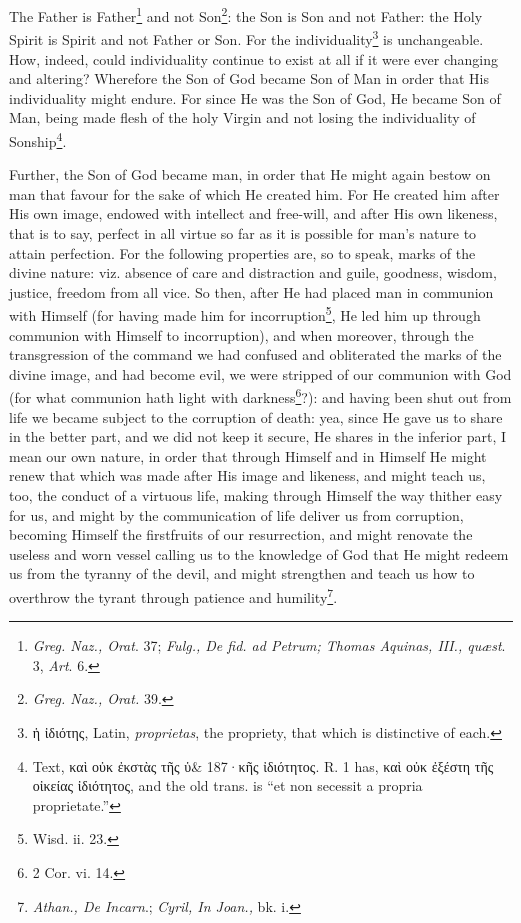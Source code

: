 The Father is Father\footnote{\emph{Greg. Naz., Orat}. 37; \emph{Fulg., De fid. ad Petrum; Thomas Aquinas, III., quæst}. 3, \emph{Art}. 6.} and not Son\footnote{\emph{Greg. Naz., Orat. }39.}: the Son is Son and not Father: the Holy Spirit is Spirit and not Father or Son. For the individuality\footnote{\textgreek{ἡ ἰδιότης}, Latin, \emph{proprietas}, the propriety, that which is distinctive of each.} is unchangeable. How, indeed, could individuality continue to exist at all if it were ever changing and altering? Wherefore the Son of God became Son of Man in order that His individuality might endure. For since He was the Son of God, He became Son of Man, being made flesh of the holy Virgin and not losing the individuality of Sonship\footnote{Text, \textgreek{καὶ οὐκ ἐκστὰς τῆς ὑ\& 187·κῆς ἰδιότητος}. R. 1 has, \textgreek{καὶ οὐκ ἐξέστη τῆς οἰκείας ἰδιότητος}, and the old trans. is “et non secessit a propria proprietate.”}.

Further, the Son of God became man, in order that He might again bestow on man that favour for the sake of which He created him. For He created him after His own image, endowed with intellect and free-will, and after His own likeness, that is to say, perfect in all virtue so far as it is possible for man’s nature to attain perfection. For the following properties are, so to speak, marks of the divine nature: viz. absence of care and distraction and guile, goodness, wisdom, justice, freedom from all vice. So then, after He had placed man in communion with Himself (for having made him for incorruption\footnote{Wisd. ii. 23.}, He led him up through communion with Himself to incorruption), and when moreover, through the transgression of the command we had confused and obliterated the marks of the divine image, and had become evil, we were stripped of our communion with God (for what communion hath light with darkness\footnote{2 Cor. vi. 14.}?): and having been shut out from life we became subject to the corruption of death: yea, since He gave us to share in the better part, and we did not keep it secure, He shares in the inferior part, I mean our own nature, in order that through Himself and in Himself He might renew that which was made after His image and likeness, and might teach us, too, the conduct of a virtuous life, making through Himself the way thither easy for us, and might by the communication of life deliver us from corruption, becoming Himself the firstfruits of our resurrection, and might renovate the useless and worn vessel calling us to the knowledge of God that He might redeem us from the tyranny of the devil, and might strengthen and teach us how to overthrow the tyrant through patience and humility\footnote{\emph{Athan., De Incarn}.; \emph{Cyril, In Joan., }bk. i.}.

